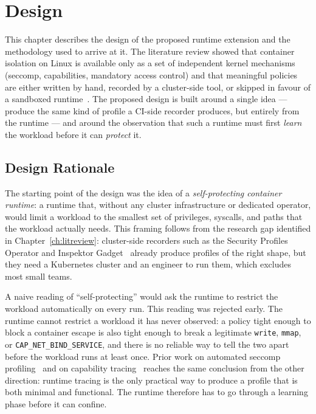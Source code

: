 
\chapter{Design}\label{ch:design}

This chapter describes the design of the proposed runtime extension and the methodology used to arrive at it. The literature review showed that container isolation on Linux is available only as a set of independent kernel mechanisms (seccomp, capabilities, mandatory access control) and that meaningful policies are either written by hand, recorded by a cluster-side tool, or skipped in favour of a sandboxed runtime~\cite{lopes2020,wang2022,spo2025,inspektorgadget2025}. The proposed design is built around a single idea --- produce the same kind of profile a CI-side recorder produces, but entirely from the runtime --- and around the observation that such a runtime must first \emph{learn} the workload before it can \emph{protect} it.

\section{Design Rationale}\label{sec:design-rationale}

The starting point of the design was the idea of a \emph{self-protecting container runtime}: a runtime that, without any cluster infrastructure or dedicated operator, would limit a workload to the smallest set of privileges, syscalls, and paths that the workload actually needs. This framing follows from the research gap identified in Chapter~\ref{ch:litreview}: cluster-side recorders such as the Security Profiles Operator and Inspektor Gadget~\cite{spo2025,inspektorgadget2025} already produce profiles of the right shape, but they need a Kubernetes cluster and an engineer to run them, which excludes most small teams.

A naive reading of ``self-protecting'' would ask the runtime to restrict the workload automatically on every run. This reading was rejected early. The runtime cannot restrict a workload it has never observed: a policy tight enough to block a container escape is also tight enough to break a legitimate \texttt{write}, \texttt{mmap}, or \texttt{CAP\_NET\_BIND\_SERVICE}, and there is no reliable way to tell the two apart before the workload runs at least once. Prior work on automated seccomp profiling~\cite{lopes2020} and on capability tracing~\cite{bcc2025} reaches the same conclusion from the other direction: runtime tracing is the only practical way to produce a profile that is both minimal and functional. The runtime therefore has to go through a learning phase before it can confine.

